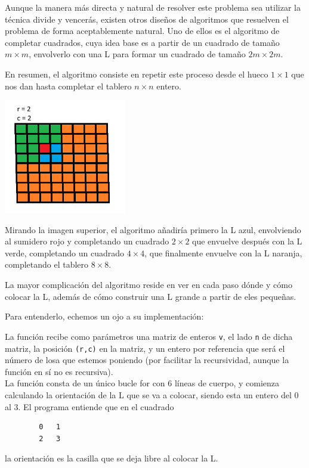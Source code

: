 \documentclass{article}
\begin{document}
    Aunque la manera más directa y natural de resolver este problema sea utilizar la técnica divide y
    vencerás, existen otros diseños de algoritmos que resuelven el problema de forma aceptablemente
    natural. Uno de ellos es el algoritmo de completar cuadrados, cuya idea base es a partir
    de un cuadrado de tamaño $m \times m$, envolverlo con una L para formar un cuadrado
    de tamaño $2m \times 2m$. 

    En resumen, el algoritmo consiste en repetir este proceso desde el hueco $1 \times 1$
    que nos dan hasta completar el tablero $n \times n$ entero.

    \includegraphics[width=0.4\textwidth]{P2/explicación0.png}

    Mirando la imagen superior, el algoritmo añadiría primero la L azul,
    envolviendo al sumidero rojo y completando un cuadrado $2 \times 2$ que 
    envuelve después con la L verde, completando un cuadrado $4 \times 4$,
    que finalmente envuelve con la L naranja, completando el tablero
    $8 \times 8$.

    La mayor complicación del algoritmo reside en ver en cada paso dónde y cómo colocar
    la L, además de cómo construir una L grande a partir de eles pequeñas.

    Para entenderlo, echemos un ojo a su implementación:

    

    La función recibe como parámetros una matriz de enteros \texttt{v}, el lado \texttt{n} de dicha matriz,
    la posición \texttt{(r,c)} en la matriz, y un entero por referencia que será el número de losa
    que estemos poniendo (por facilitar la recursividad, aunque la función en sí no es recursiva). \\

    La función consta de un único bucle for con 6 líneas de cuerpo, y comienza calculando la
    orientación de la L que se va a colocar, siendo esta un entero del 0 al 3. El programa
    entiende que en el cuadrado
    \begin{verbatim}
        0   1
        2   3
    \end{verbatim}
    la orientación es la casilla que se deja libre al colocar la L. \\
\end{document}
